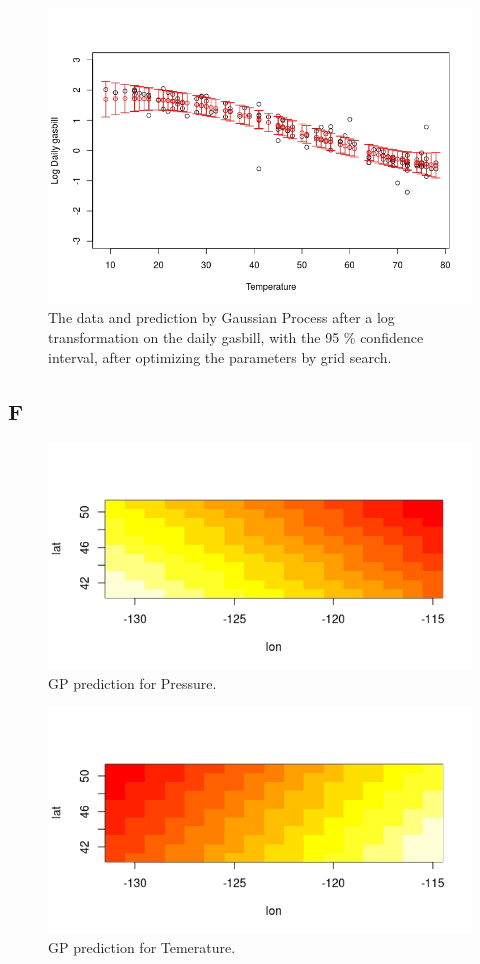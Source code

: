 \documentclass{article}
\begin{document}
\begin{figure}
\includegraphics[width=\textwidth]{util_gp_grid.jpeg}
\caption{The data and prediction by Gaussian Process after a log transformation on the daily gasbill, with the 95 \% confidence interval, after optimizing the parameters by grid search.}
\label{fig:util_log2}
\end{figure}

\subsection*{F}
\begin{figure}
\includegraphics[width=\textwidth]{weather.jpeg}
\caption{GP prediction for Pressure.}
\label{fig:we}
\end{figure}


\begin{figure}
\includegraphics[width=\textwidth]{weather_tem.jpeg}
\caption{GP prediction for Temerature.}
\label{fig:we}
\end{figure}
\end{document}
